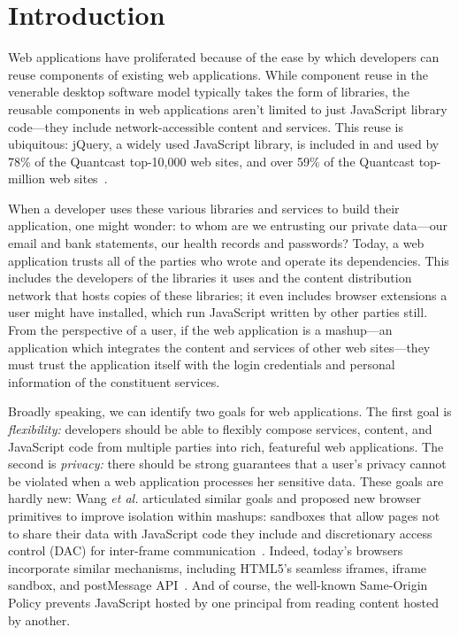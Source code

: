 \section{Introduction}
\label{sec:intro}

Web applications have proliferated because of the ease by which
developers can reuse components of existing web applications.
%
While component reuse in the venerable desktop software model typically
takes the form of libraries, the reusable components in web applications
aren't limited to just JavaScript library code---they include
network-accessible content and services.
%
This reuse is ubiquitous\@: jQuery, a widely used JavaScript
library, is included in and used by 78\% of the Quantcast top-10,000
web sites, and over 59\% of the Quantcast top-million web
sites~\cite{quantcast}.

When a developer uses these various libraries and services to build
their application, one might wonder: to whom are we entrusting our
private data---our email and bank statements, our health records and
passwords?
%
Today, a web application trusts all of the parties who wrote and
operate its dependencies.
%
This includes the developers of the libraries it uses and the content
distribution network that hosts copies of these libraries; it even
includes browser extensions a user might have installed, which run
JavaScript written by other parties still.
%
From the perspective of a user, if the web application is a mashup---an
application which integrates the content and services of other web
sites---they must trust the application itself with the login
credentials and personal information of the constituent services.

 Broadly speaking, we can identify two goals for web applications.
%
The first goal is {\em flexibility:\/} developers should be able to
flexibly compose services, content, and JavaScript code from multiple
parties into rich, featureful web applications.
%
The second is {\em privacy:\/} there should be strong guarantees that a
user's privacy cannot be violated when a web application processes her
sensitive data.
%
These goals are hardly new: Wang {\em et al.} articulated similar goals
and proposed new browser primitives to improve isolation within mashups:
sandboxes that allow pages not to share their data with JavaScript code
they include and discretionary access control (DAC) for inter-frame
communication~\cite{mashupos}.
%
Indeed, today's browsers incorporate similar mechanisms, including
HTML5's seamless iframes, iframe sandbox, and postMessage
API~\cite{html5}.
%
And of course, the well-known Same-Origin Policy prevents JavaScript
hosted by one principal from reading content hosted by another.

